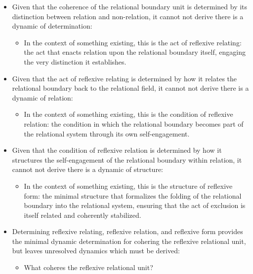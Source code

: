 \documentclass[11pt]{article}
\begin{document}
\begin{itemize}
\item Given that the coherence of the relational boundary unit is determined by its distinction between relation and non-relation, it cannot not derive there is a dynamic of determination:

\begin{itemize}
\item In the context of something existing, this is the act of reflexive relating: the act that enacts relation upon the relational boundary itself, engaging the very distinction it establishes.
\end{itemize}

\item Given that the act of reflexive relating is determined by how it relates the relational boundary back to the relational field, it cannot not derive there is a dynamic of relation:

\begin{itemize}
\item In the context of something existing, this is the condition of reflexive relation: the condition in which the relational boundary becomes part of the relational system through its own self-engagement.
\end{itemize}

\item Given that the condition of reflexive relation is determined by how it structures the self-engagement of the relational boundary within relation, it cannot not derive there is a dynamic of structure:

\begin{itemize}
\item In the context of something existing, this is the structure of reflexive form: the minimal structure that formalizes the folding of the relational boundary into the relational system, ensuring that the act of exclusion is itself related and coherently stabilized.
\end{itemize}

\item Determining reflexive relating, reflexive relation, and reflexive form provides the minimal dynamic determination for cohering the reflexive relational unit, but leaves unresolved dynamics which must be derived:
\begin{itemize}
\item What coheres the reflexive relational unit?
\end{itemize}
\end{itemize}
\end{document}
